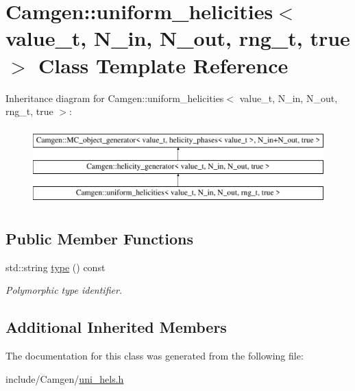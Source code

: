 \hypertarget{a00548}{\section{Camgen\-:\-:uniform\-\_\-helicities$<$ value\-\_\-t, N\-\_\-in, N\-\_\-out, rng\-\_\-t, true $>$ Class Template Reference}
\label{a00548}
}
Inheritance diagram for Camgen\-:\-:uniform\-\_\-helicities$<$ value\-\_\-t, N\-\_\-in, N\-\_\-out, rng\-\_\-t, true $>$\-:\begin{figure}[H]
\begin{center}
\leavevmode
\includegraphics[height=3.000000cm]{a00548}
\end{center}
\end{figure}
\subsection*{Public Member Functions}
\begin{DoxyCompactItemize}
\item 
\hypertarget{a00548_acf12c6a51b1b77083f196504974c937e}{std\-::string \hyperlink{a00548_acf12c6a51b1b77083f196504974c937e}{type} () const }\label{a00548_acf12c6a51b1b77083f196504974c937e}

\begin{DoxyCompactList}\small\item\em Polymorphic type identifier. \end{DoxyCompactList}\end{DoxyCompactItemize}
\subsection*{Additional Inherited Members}


The documentation for this class was generated from the following file\-:\begin{DoxyCompactItemize}
\item 
include/\-Camgen/\hyperlink{a00795}{uni\-\_\-hels.\-h}\end{DoxyCompactItemize}
